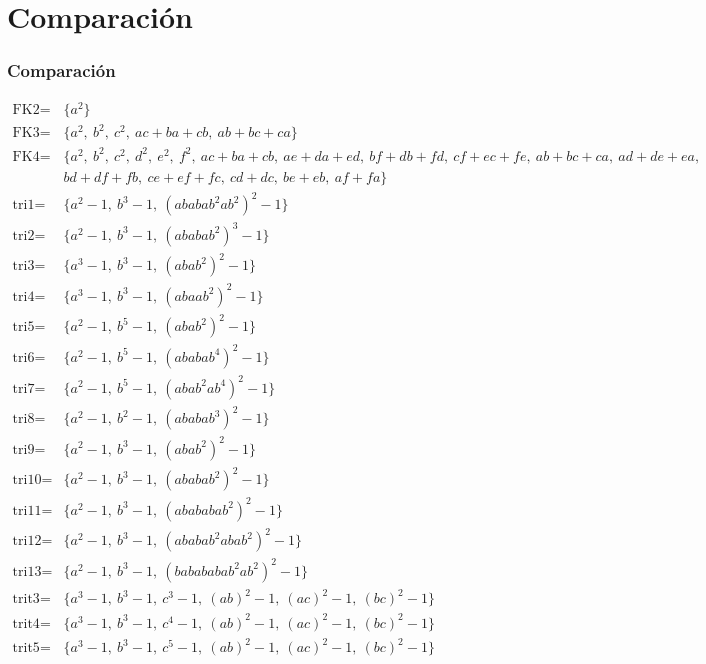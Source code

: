 \documentclass[spanish, aspectratio=169, hidecontrols]{beamer}
\begin{document}
\section{Comparación}

\begin{frame}[shrink]
  \frametitle{Comparación} %
  \setlength{\jot}{0pt}
  \begin{align*}
    \text{FK2} =& \{a^2\} \\
    \text{FK3} =& \{a^2,\ b^2,\ c^2,\ ac + ba + cb,\ ab + bc + ca\} \\
    \text{FK4} =& \{a^2,\ b^2,\ c^2,\ d^2,\ e^2,\ f^2,\ ac + ba + cb,\ ae + da + ed,\ bf + db + fd,\ cf + ec + fe,\ ab + bc + ca,\ ad + de + ea, \\
      & bd + df + fb,\ ce + ef + fc,\ cd + dc,\ be + eb,\ af + fa\} \\
    \text{tri1} =& \{a^2 - 1,\ b^3 - 1,\ {(ababab^2ab^2)}^2 - 1\} \\
    \text{tri2} =& \{a^2 - 1,\ b^3 - 1,\ {(ababab^2)}^3 - 1\} \\
    \text{tri3} =& \{a^3 - 1,\ b^3 - 1,\ {(abab^2)}^2 - 1\} \\
    \text{tri4} =& \{a^3 - 1,\ b^3 - 1,\ {(abaab^2)}^2 - 1\} \\
    \text{tri5} =& \{a^2 - 1,\ b^5 - 1,\ {(abab^2)}^2 - 1\} \\
    \text{tri6} =& \{a^2 - 1,\ b^5 - 1,\ {(ababab^4)}^2 - 1\} \\
    \text{tri7} =& \{a^2 - 1,\ b^5 - 1,\ {(abab^2ab^4)}^2 - 1\} \\
    \text{tri8} =& \{a^2 - 1,\ b^2 - 1,\ {(ababab^3)}^2 - 1\} \\
    \text{tri9} =& \{a^2 - 1,\ b^3 - 1,\ {(abab^2)}^2 - 1\} \\
    \text{tri10} =& \{a^2 - 1,\ b^3 - 1,\ {(ababab^2)}^2 - 1\} \\
    \text{tri11} =& \{a^2 - 1,\ b^3 - 1,\ {(abababab^2)}^2 - 1\} \\
    \text{tri12} =& \{a^2 - 1,\ b^3 - 1,\ {(ababab^2abab^2)}^2 - 1\} \\
    \text{tri13} =& \{a^2 - 1,\ b^3 - 1,\ {(babababab^2ab^2)}^2 - 1\} \\
    \text{trit3} =& \{a^3 - 1,\ b^3 - 1,\ c^3 - 1,\ {(ab)}^2 - 1,\ {(ac)}^2 - 1,\ {(bc)}^2 - 1\} \\
    \text{trit4} =& \{a^3 - 1,\ b^3 - 1,\ c^4 - 1,\ {(ab)}^2 - 1,\ {(ac)}^2 - 1,\ {(bc)}^2 - 1\} \\
    \text{trit5} =& \{a^3 - 1,\ b^3 - 1,\ c^5 - 1,\ {(ab)}^2 - 1,\ {(ac)}^2 - 1,\ {(bc)}^2 - 1\}
  \end{align*}
\end{frame}
\end{document}
